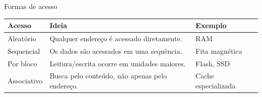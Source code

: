 \begin{frame}[t]{Formas de acesso}
  \small
  \setlength{\tabcolsep}{4pt}
  \begin{tabular}{>{\raggedright\arraybackslash}p{} p{} p{}}
    \toprule
    \textbf{Acesso} & \textbf{Ideia} & \textbf{Exemplo} \\
    \midrule
    Aleatório & Qualquer endereço é acessado diretamente. & RAM \\
    Sequencial & Os dados são acessados em uma sequência. & Fita magnética \\
    Por bloco & Leitura/escrita ocorre em unidades maiores. & Flash, SSD \\
    Associativo & Busca pelo conteúdo, não apenas pelo endereço. & Cache especializada \\
    \bottomrule
  \end{tabular}
\end{frame}
